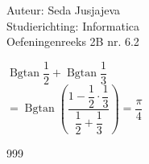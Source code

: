 \documentclass[a4paper]{article}
\newcommand{\Bgtan}{\operatorname{Bgtan}}
\begin{document}
\noindent \large Auteur: Seda Jusjajeva\\
\noindent \large Studierichting: Informatica\\
\noindent \large Oefeningenreeks 2B nr. 6.2 \\

\medskip

\normalsize

$\Bgtan\dfrac{1}{2} + \Bgtan\dfrac{1}{3}$ \\

$= \Bgtan\left(\dfrac{1-\dfrac{1}{2}\cdot\dfrac{1}{3}}{\dfrac{1}{2}+\dfrac{1}{3}}\right) = \dfrac{\pi}{4}$ \\



\begin{thebibliography}{999}
\end{thebibliography}
\end{document}
